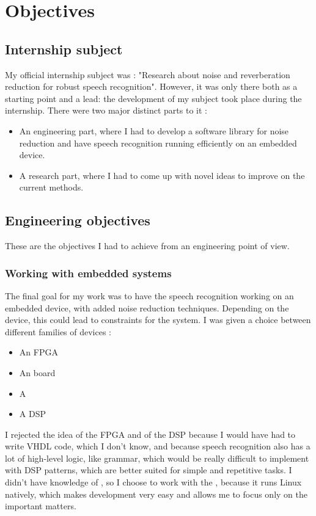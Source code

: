 \section{Objectives}
\subsection{Internship subject}
My official internship subject was : "Research about noise and reverberation reduction for robust speech recognition".
However, it was only there both as a starting point and a lead: the development of my subject took place during the internship.
There were two major distinct parts to it :
\begin{itemize}
\item An engineering part, where I had to develop a software library for noise reduction and have speech recognition running efficiently on an embedded device.
\item A research part, where I had to come up with novel ideas to improve on the current methods.
\end{itemize}


\subsection{Engineering objectives}
These are the objectives I had to achieve from an engineering point of view.
\subsubsection{Working with embedded systems}
The final goal for my work was to have the speech recognition working on an embedded device, with added noise reduction techniques.
Depending on the device, this could lead to constraints for the system.
I was given a choice between different families of devices : 
\begin{itemize}
\item An \ac{FPGA}
\item An  board
\item A 
\item A \ac{DSP}
\end{itemize}
I rejected the idea of the \ac{FPGA} and of the \ac{DSP} because I would have had to write \ac{VHDL} code, which I don't know, and because speech recognition also has a lot of high-level logic, like grammar, which would be really difficult to implement with \ac{DSP} patterns, which are better suited for simple and repetitive tasks.
I didn't have knowledge of , so I choose to work with the , because it runs Linux natively, which makes development very easy and allows me to focus only on the important matters.
